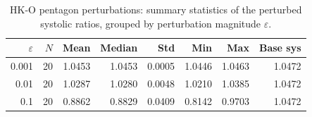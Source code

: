\begin{table}[h]
\centering
\begin{tabular}{rrrrrrrr}
\toprule
$\varepsilon$ & $N$ & Mean & Median & Std & Min & Max & Base sys \\
\midrule
0.001 & 20 & 1.0453 & 1.0453 & 0.0005 & 1.0446 & 1.0463 & 1.0472 \\
0.01 & 20 & 1.0287 & 1.0280 & 0.0048 & 1.0210 & 1.0385 & 1.0472 \\
0.1 & 20 & 0.8862 & 0.8829 & 0.0409 & 0.8142 & 0.9703 & 1.0472 \\
\bottomrule
\end{tabular}
\caption{HK-O pentagon perturbations: summary statistics of the perturbed systolic ratios, grouped by perturbation magnitude $\varepsilon$.}
\label{tab:pentagon-perturb-stats}
\end{table}
